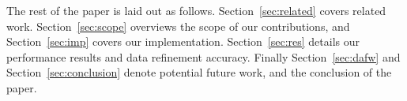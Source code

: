 The rest of the paper is laid out as follows.
Section~\ref{sec:related} covers related work. Section~\ref{sec:scope}
overviews the scope of our contributions, and Section~\ref{sec:imp}
covers our implementation. Section~\ref{sec:res} details our
performance results and data refinement accuracy. Finally
Section~\ref{sec:dafw} and Section~\ref{sec:conclusion} denote
potential future work, and the conclusion of the paper.
